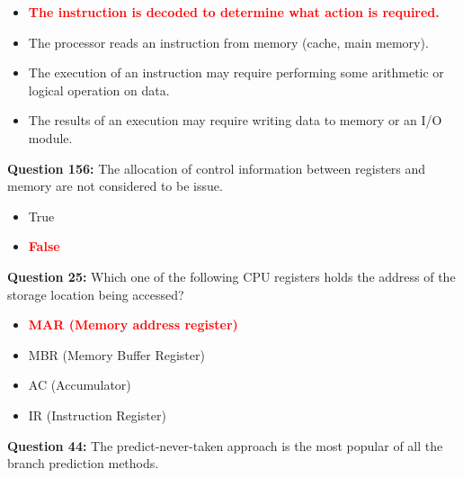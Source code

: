 \documentclass[12pt,a4paper]{article}
\begin{document}
\begin{itemize}
    \item[\textbf{A.}] \textcolor{red}{\textbf{The instruction is decoded to determine what action is required.}}
    \item[\textbf{B.}] The processor reads an instruction from memory (cache, main memory).
    \item[\textbf{C.}] The execution of an instruction may require performing some arithmetic or logical operation on data.
    \item[\textbf{D.}] The results of an execution may require writing data to memory or an I/O module.
\end{itemize}

\vspace{0.5cm}

\vspace{0.5cm}

\textbf{Question 156:} The allocation of control information between registers and memory are not considered to be issue.

\begin{itemize}
    \item[\textbf{A.}] True
    \item[\textbf{B.}] \textcolor{red}{\textbf{False}}
\end{itemize}

\vspace{0.5cm}

\vspace{0.5cm}

\textbf{Question 25:} Which one of the following CPU registers holds the address of the storage location being accessed?

\begin{itemize}
    \item[\textbf{A.}] \textcolor{red}{\textbf{MAR (Memory address register)}}
    \item[\textbf{B.}] MBR (Memory Buffer Register)
    \item[\textbf{C.}] AC (Accumulator)
    \item[\textbf{D.}] IR (Instruction Register)
\end{itemize}

\vspace{0.5cm}

\vspace{0.5cm}

\textbf{Question 44:} The predict-never-taken approach is the most popular of all the branch prediction methods.
\end{document}
